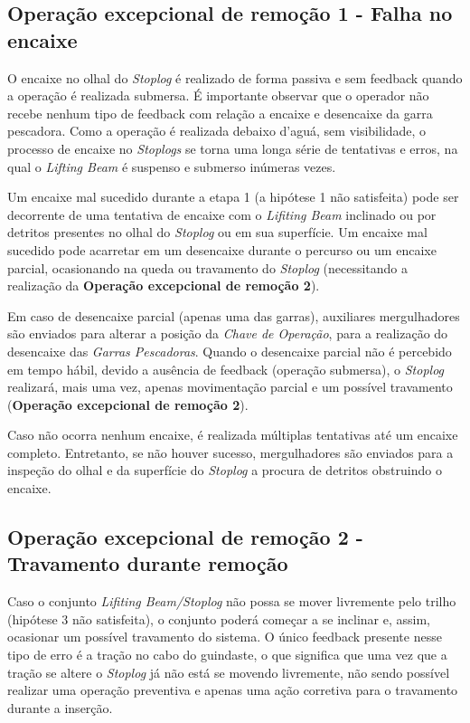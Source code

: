 \subsection{Operação excepcional de remoção 1 - Falha no encaixe}
\label{op:rem:1}
O encaixe no olhal do \emph{Stoplog} é realizado de forma passiva e sem feedback
quando a operação é realizada submersa. É importante observar que o operador não
recebe nenhum tipo de feedback com relação a encaixe e desencaixe da garra
pescadora. Como a operação é realizada debaixo d'aguá, sem visibilidade, o
processo de encaixe no \emph{Stoplogs} se torna uma longa série de tentativas e
erros, na qual o \emph{Lifting Beam} é suspenso e submerso inúmeras vezes.

Um encaixe mal sucedido durante a etapa 1 (a hipótese 1 não satisfeita) pode ser
decorrente de uma tentativa de encaixe com o \emph{Lifiting Beam} inclinado ou
por detritos presentes no olhal do \emph{Stoplog} ou em sua superfície. Um
encaixe mal sucedido pode acarretar em um desencaixe durante o percurso ou um
encaixe parcial, ocasionando na queda ou travamento do \emph{Stoplog}
(necessitando a realização da \textbf{Operação excepcional de remoção 2}).

Em caso de desencaixe parcial (apenas uma das garras), auxiliares mergulhadores
são enviados para alterar a posição da \emph{Chave de Operação}, para a
realização do desencaixe das \emph{Garras Pescadoras}. Quando o desencaixe
parcial não é percebido em tempo hábil, devido a ausência de feedback (operação
submersa), o \emph{Stoplog} realizará, mais uma vez, apenas movimentação parcial
e um possível travamento (\textbf{Operação excepcional de remoção 2}).

Caso não ocorra nenhum encaixe, é realizada múltiplas tentativas até um encaixe
completo. Entretanto, se não houver sucesso, mergulhadores são enviados para a
inspeção do olhal e da superfície do \emph{Stoplog} a procura de detritos
obstruindo o encaixe.

\subsection{Operação excepcional de remoção 2 - Travamento durante remoção}
\label{op:rem:2}

Caso o conjunto \emph{Lifiting Beam/Stoplog} não possa se mover livremente pelo trilho (hipótese 3 não satisfeita), o conjunto poderá começar a se inclinar e, assim, ocasionar um possível travamento do sistema. O único feedback presente nesse tipo de erro é a tração no cabo do guindaste, o que significa que uma vez que a tração se altere o \emph{Stoplog} já não está se movendo livremente, não sendo possível realizar uma operação preventiva e apenas uma ação corretiva para o travamento durante a inserção.

